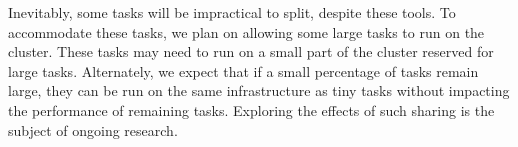Inevitably, some tasks will be impractical to split, despite these tools.
To accommodate these
tasks, we plan on allowing some large tasks to run on the cluster. These tasks
may need to run on a small part of the cluster reserved for large tasks.
Alternately, we expect that if a small percentage of tasks remain large, they
can be run on the same infrastructure as tiny tasks without impacting the
performance of remaining tasks. Exploring the effects of such sharing is
the subject of ongoing research.

